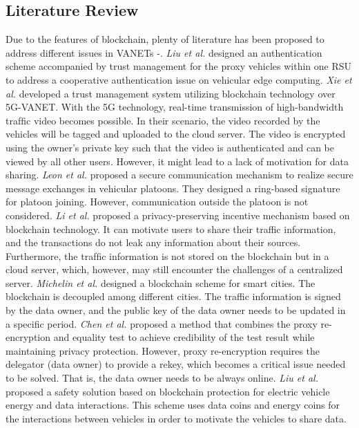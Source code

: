 \documentclass[journal,10pt]{IEEEtran}
\begin{document}
\subsection{Literature Review}
Due to the features of blockchain, plenty of literature has been proposed to address different issues in VANETs \cite{BECADT}-\cite{Blockchain-enabled security in electric vehicles cloud and edge computing}. 
 \emph{Liu et al.} \cite{BECADT} designed an authentication scheme accompanied by trust management for the proxy vehicles within one RSU to address a cooperative authentication issue on vehicular edge computing. 
 \emph{Xie et al.} \cite{BST} developed a trust management system utilizing blockchain technology over 5G-VANET. With the 5G technology, real-time transmission of high-bandwidth trafﬁc video becomes possible. In their scenario, the video recorded by the vehicles will be tagged and uploaded to the cloud server. The video is encrypted using the owner’s private key such that the video is authenticated and can be viewed by all other users. However, it might lead to a lack of motivation for data sharing.
\emph{Leon et al.} \cite{Secure blockchain-based communication scheme for connected vehicles} proposed a secure communication mechanism to realize secure message exchanges in vehicular platoons. They designed a ring-based signature for platoon joining. However, communication outside the platoon is not considered.
\emph{Li et al.} \cite{Creditcoin: A privacy-preserving blockchain-based incentive announcement network for communications of smart vehicles} proposed a privacy-preserving incentive mechanism based on blockchain technology. It can motivate users to share their traffic information, and the transactions do not leak any information about their sources. Furthermore, the trafﬁc information is not stored on the blockchain but in a cloud server, which, however, may
still encounter the challenges of a centralized server.
\emph{Michelin et al.} \cite{Speedychain: A framework for decoupling data from blockchain for smart cities} designed a blockchain scheme for smart cities. The blockchain is decoupled among different cities. The traffic information is signed by the data owner, and the public key of the data owner needs to be updated in a specific period.
\emph{Chen et al.} \cite{BPREET} proposed a method that combines the proxy re-encryption and equality test to achieve credibility of the test result while maintaining privacy protection. However, proxy re-encryption requires the delegator (data owner) to provide a rekey, which becomes a critical issue needed to be solved. That is, the data owner needs to be always online.
\emph{Liu et al.} \cite{Blockchain-enabled security in electric vehicles cloud and edge computing}
proposed a safety solution based on blockchain protection for electric vehicle energy and data interactions. This scheme uses data coins and energy coins for the interactions between vehicles in order to motivate the vehicles to share data.
\end{document}

